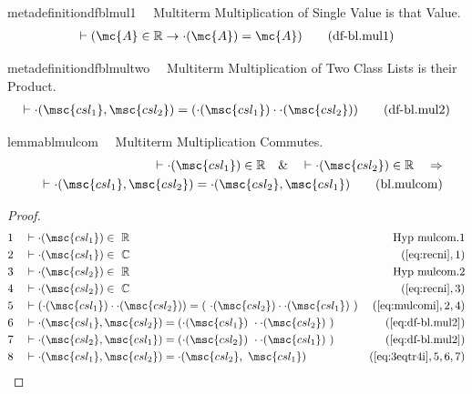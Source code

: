 \begin{restatable}{metadefinition}{dfblmul1}~~ Multiterm Multiplication of Single
Value is that Value.
\begin{align}
\vdash ( \mc{A} \in \mathbb{R} \rightarrow \cdot( \mc{A} ) = \mc{A}
    )\label{eq:df-bl.mul1}\tag{df-bl.mul1}
\end{align}
\end{restatable}

\begin{restatable}{metadefinition}{dfblmultwo}~~ Multiterm Multiplication of Two Class
Lists is their Product.
\begin{align}
\vdash \cdot( \msc{csl_1} , \msc{csl_2} ) = ( \cdot( \msc{csl_1} ) \cdot \cdot(
    \msc{csl_2} ) )\label{eq:df-bl.mul2}\tag{df-bl.mul2}
\end{align}
\end{restatable}

\begin{restatable}{lemma}{blmulcom}~~ Multiterm Multiplication Commutes.
\begin{align}
\vdash \cdot( \msc{csl_1} ) \in \mathbb{R}\quad\&\quad \vdash \cdot(
    \msc{csl_2} ) \in \mathbb{R}\quad\Rightarrow \notag \\ 
	\quad \vdash \cdot( \msc{csl_1}
    , \msc{csl_2} ) = \cdot( \msc{csl_2} , \msc{csl_1}
    )\label{eq:bl.mulcom}\tag{bl.mulcom}
\end{align}
\end{restatable}

\begin{proof}
\begin{align}
  1 &&  & \vdash \cdot( \msc{csl_1} ) \in
     ~\mathbb{R}&\text{Hyp~mulcom.1}\notag%
  \\ 2 &&  & \vdash \cdot( \msc{csl_1} ) \in
     ~\mathbb{C}&(\mbox{\ref{eq:recni}},1)\notag
  \\ 3 &&  & \vdash \cdot( \msc{csl_2} ) \in
     ~\mathbb{R}&\text{Hyp~mulcom.2}\notag%
  \\ 4 &&  & \vdash \cdot( \msc{csl_2} ) \in
     ~\mathbb{C}&(\mbox{\ref{eq:recni}},3)\notag
  \\ 5 &&  & \vdash ( \cdot( \msc{csl_1} ) \cdot \cdot( \msc{csl_2} ) ) = (
     ~\cdot( \msc{csl_2} ) \cdot \cdot( \msc{csl_1} )
     ~)&(\mbox{\ref{eq:mulcomi}},2,4)\notag
  \\ 6 &&  & \vdash \cdot( \msc{csl_1} , \msc{csl_2} ) = ( \cdot( \msc{csl_1} )
     ~\cdot \cdot( \msc{csl_2} )
     ~)&(\mbox{\ref{eq:df-bl.mul2}})\notag
  \\ 7 &&  & \vdash \cdot( \msc{csl_2} , \msc{csl_1} ) = ( \cdot( \msc{csl_2} )
     ~\cdot \cdot( \msc{csl_1} )
     ~)&(\mbox{\ref{eq:df-bl.mul2}})\notag
  \\ 8 &&  & \vdash \cdot( \msc{csl_1} , \msc{csl_2} ) = \cdot( \msc{csl_2} ,
     ~\msc{csl_1} )&(\mbox{\ref{eq:3eqtr4i}},5,6,7)\notag
\end{align}
\end{proof}


